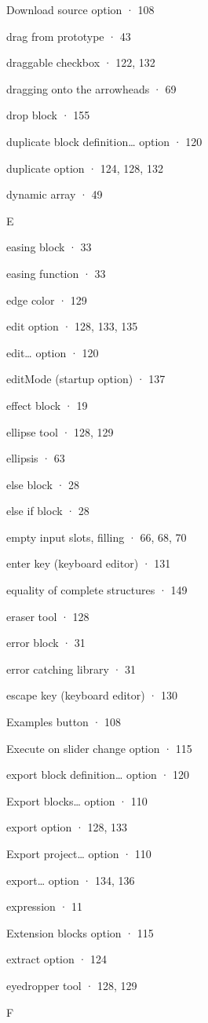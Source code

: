 Download source option · 108

drag from prototype · 43

draggable checkbox · 122, 132

dragging onto the arrowheads · 69

drop block · 155

duplicate block definition\ldots{} option · 120

duplicate option · 124, 128, 132

dynamic array · 49

E

easing block · 33

easing function · 33

edge color · 129

edit option · 128, 133, 135

edit\ldots{} option · 120

editMode (startup option) · 137

effect block · 19

ellipse tool · 128, 129

ellipsis · 63

else block · 28

else if block · 28

empty input slots, filling · 66, 68, 70

enter key (keyboard editor) · 131

equality of complete structures · 149

eraser tool · 128

error block · 31

error catching library · 31

escape key (keyboard editor) · 130

Examples button · 108

Execute on slider change option · 115

export block definition\ldots{} option · 120

Export blocks\ldots{} option · 110

export option · 128, 133

Export project\ldots{} option · 110

export\ldots{} option · 134, 136

expression · 11

Extension blocks option · 115

extract option · 124

eyedropper tool · 128, 129

F

